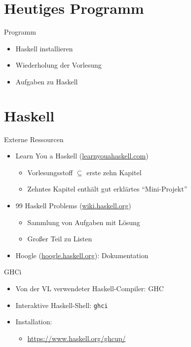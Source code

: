\documentclass{beamer}
\begin{document}

\section{Heutiges Programm}
\begin{frame}{Programm}
        \begin{itemize}
                \item Haskell installieren
                \item Wiederholung der Vorlesung
                \item Aufgaben zu Haskell
        \end{itemize}
\end{frame}


\section{Haskell}

\begin{frame}{Externe Ressourcen}
  \begin{itemize}
    \item Learn You a Haskell (\href{http://learnyouahaskell.com}{learnyouahaskell.com})
    \begin{itemize}
      \item Vorlesungsstoff $\subseteq$ erste zehn Kapitel
      \item Zehntes Kapitel enthält gut erklärtes \enquote{Mini-Projekt}
    \end{itemize}
    \item 99 Haskell Problems (\href{https://wiki.haskell.org/H-99:_Ninety-Nine_Haskell_Problems}{wiki.haskell.org})
    \begin{itemize}
      \item Sammlung von Aufgaben mit Lösung
      \item Großer Teil zu Listen
    \end{itemize}
    \item Hoogle (\href{https://hoogle.haskell.org}{hoogle.haskell.org}): Dokumentation
  \end{itemize}
\end{frame}

\begin{frame}[fragile]{GHCi}

        \begin{itemize}
                \item Von der VL verwendeter Haskell-Compiler: GHC
                \item Interaktive Haskell-Shell: \texttt{ghci}
                \item Installation:
                \begin{itemize}
                  \item \url{https://www.haskell.org/ghcup/}
                \end{itemize}
        \end{itemize}
\end{frame}
\end{document}
